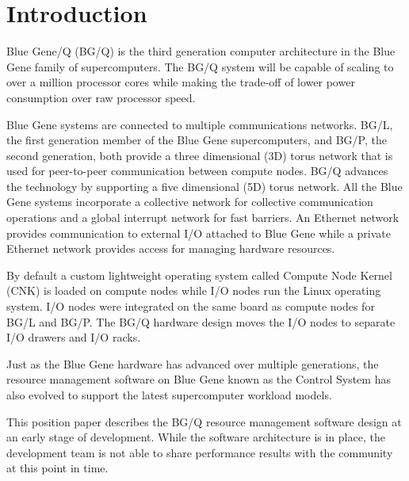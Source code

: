 \section{Introduction}
Blue Gene/Q (BG/Q) is the third generation computer architecture in the Blue Gene family of supercomputers. 
The BG/Q system will be capable of scaling to over a million processor cores while making the trade-off of 
lower power consumption over raw processor speed.

Blue Gene systems are connected to multiple communications networks. BG/L, the first generation member of the
Blue Gene supercomputers, and BG/P, the second generation, both provide a three dimensional (3D) torus network that is used for peer-to-peer
communication between compute nodes. BG/Q advances the technology by supporting a five dimensional (5D) torus network. All the Blue Gene 
systems incorporate a collective network for collective communication operations and a global interrupt network for fast barriers.
An Ethernet network provides communication to external I/O attached to Blue Gene while a private Ethernet network
provides access for managing hardware resources.   

By default a custom lightweight operating system called Compute Node Kernel (CNK) is loaded on compute nodes while I/O nodes
run the Linux operating system. I/O nodes were integrated on the same board as compute nodes for BG/L and BG/P. The BG/Q
hardware design moves the I/O nodes to separate I/O drawers and I/O racks.

Just as the Blue Gene hardware has advanced over multiple generations, the resource management software on Blue Gene 
known as the Control System has also evolved to support the latest supercomputer workload models.

This position paper describes the BG/Q resource management software design at an early stage of development.
While the software architecture is in place, the development team is not able to share performance results
with the community at this point in time.
